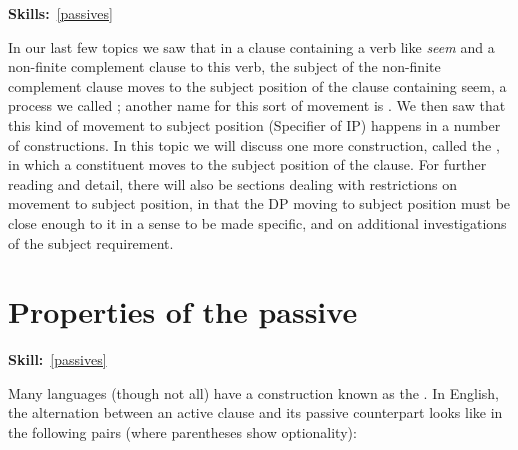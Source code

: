 \documentclass{article}
\begin{document}
\maketitle
\subtitle{Topic 8 Course Notes: Passives}
\hfill{}\textbf{Skills:}~\ref{passives}

In our last few topics we saw that in a clause containing a verb like \emph{seem} and a non-finite complement clause to this verb, the subject of the non-finite complement clause moves to the subject position of the clause containing seem, a process we called ; another name for this sort of movement is . We then saw that this kind of movement to subject position (Specifier of IP) happens in a number of constructions. In this topic we will discuss one more construction, called the , in which a constituent moves to the subject position of the clause. For further reading and detail, there will also be sections dealing with  restrictions on movement to subject position, in that the DP moving to subject position must be close enough to it in a sense to be made specific, and on additional investigations of the subject requirement.

\section{Properties of the passive}
\hfill{}\textbf{Skill:}~\ref{passives}

Many languages (though not all) have a construction known as the . In English, the alternation between an active clause and its passive counterpart looks like in the following pairs (where parentheses show optionality):
\begin{exe}
\begin{multicols}{2}
    \label{passive_examples_1}
    \label{passive_examples_2}
\end{multicols}
\end{exe}
\end{document}
